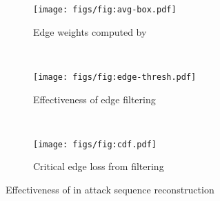 \begin{figure*}[!t]
    \centering
    \begin{subfigure}[t]{0.32\textwidth}
        \centering
        \texttt{[image: figs/fig:avg-box.pdf]}
        \caption{Edge weights computed by \tool}
        \label{fig:box}
    \end{subfigure}%
    ~ 
    \begin{subfigure}[t]{0.32\textwidth}
        \centering
        \texttt{[image: figs/fig:edge-thresh.pdf]}
        \caption{Effectiveness of edge filtering} 
        \label{fig:edge-thresh}
    \end{subfigure}
    ~
        \begin{subfigure}[t]{0.32\textwidth}
        \centering
        \texttt{[image: figs/fig:cdf.pdf]}
        \caption{Critical edge loss from filtering} 
        \label{fig:cdf}
    \end{subfigure}
    \caption{Effectiveness of \tool in attack sequence reconstruction}
    \label{fig:reconstruct}
\end{figure*}